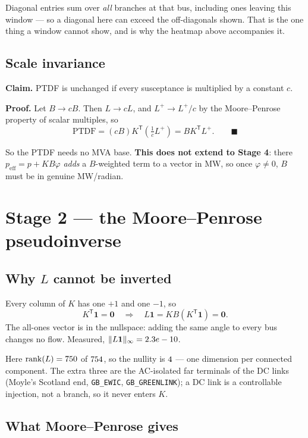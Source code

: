 \documentclass[11pt,a4paper]{article}
\newcommand{\T}{^{\mathsf{T}}}
\newcommand{\Lp}{L^{+}}
\newcommand{\note}[1]{{\color{soft}\small #1}}
\begin{document}
\note{Diagonal entries sum over \emph{all} branches at that bus, including ones
leaving this window --- so a diagonal here can exceed the off-diagonals shown.
That is the one thing a window cannot show, and is why the heatmap above
accompanies it.}

\subsection*{Scale invariance}

\textbf{Claim.} PTDF is unchanged if every susceptance is multiplied by a
constant $c$.

\textbf{Proof.} Let $B \to cB$. Then $L \to cL$, and $\Lp \to \Lp/c$ by the
Moore--Penrose property of scalar multiples, so
\[
  \text{PTDF} = (cB)K\T\!\left(\tfrac{1}{c}\Lp\right) = B K\T \Lp . \qquad\blacksquare
\]

So the PTDF needs no MVA base. \textbf{This does not extend to Stage 4}: there
$p_{\text{eff}} = p + KB\varphi$ \emph{adds} a $B$-weighted term to a vector in
MW, so once $\varphi \neq 0$, $B$ must be in genuine MW/radian.

\newpage
\section{Stage 2 --- the Moore--Penrose pseudoinverse}

\subsection*{Why $L$ cannot be inverted}

Every column of $K$ has one $+1$ and one $-1$, so
\begin{equation}
  K\T\mathbf{1} = \mathbf{0}
  \quad\Longrightarrow\quad
  L\mathbf{1} = K B (K\T \mathbf{1}) = \mathbf{0}.
\end{equation}
The all-ones vector is in the nullspace: adding the same angle to every bus
changes no flow. Measured, $\|L\mathbf{1}\|_\infty = 2.3e-10$.

Here $\operatorname{rank}(L) = 750$ of $754$, so the nullity is $4$ ---
one dimension per connected component. The extra three are the AC-isolated far
terminals of the DC links (Moyle's Scotland end, \texttt{GB\_EWIC},
\texttt{GB\_GREENLINK}); a DC link is a controllable injection, not a branch,
so it never enters $K$.

\subsection*{What Moore--Penrose gives}
\end{document}
